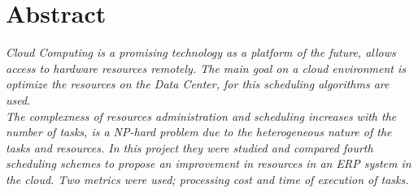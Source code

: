 \chapter*{Abstract}

 \textit{Cloud Computing is a promising technology as a platform of the future, allows access to hardware resources remotely. The main goal on a cloud environment is optimize the resources on the Data Center, for this scheduling algorithms are used.\\ The complexness of resources administration and scheduling increases with the number of tasks, is a NP-hard problem due to the heterogeneous nature of the tasks and resources.
In this project they were studied and compared fourth scheduling schemes to propose an improvement in resources in an ERP system in the cloud. Two metrics were used; processing cost and time of execution of tasks.}



